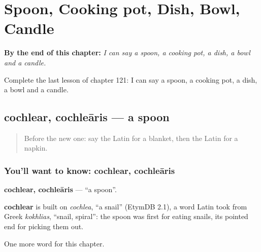 
\chapter{Spoon, Cooking pot, Dish, Bowl, Candle}
\label{ch:la-spoon-cooking-pot-dish-bowl-candle}

\begin{chapteropening}
\textbf{By the end of this chapter:} \emph{I can say a spoon, a cooking pot, a dish, a bowl and a candle.}

Complete the last lesson of chapter 121: I can say a spoon, a cooking pot, a dish, a bowl and a candle.
\end{chapteropening}

\section[cochlear, cochleāris]{cochlear, cochleāris — a spoon}

\label{lesson:LA-C121-cochlear}



\begin{quote}
Before the new one: say the Latin for a blanket, then the Latin for a napkin.
\end{quote}

\subsection*{You'll want to know: cochlear, cochleāris}
\textbf{cochlear, cochleāris} — \textquotedblleft{}a spoon\textquotedblright{}.

\begin{cousinweb}
\textbf{cochlear} is built on \emph{cochlea}, \textquotedblleft{}a snail\textquotedblright{} (EtymDB 2.1), a word Latin took from Greek \emph{kokhlias}, \textquotedblleft{}snail, spiral\textquotedblright{}: the spoon was first for eating snails, its pointed end for picking them out.
\end{cousinweb}

\begin{grammarlens}[title={What you've built}]
One more word for this chapter.
\end{grammarlens}

